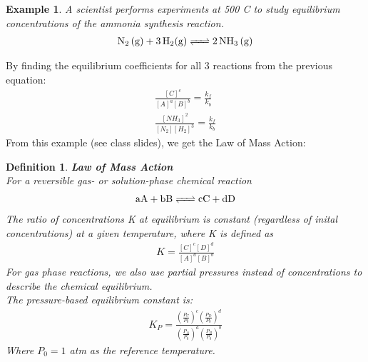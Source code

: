 \documentclass{article}  %
\newtheorem{exmp}{Example}
\newtheorem{defn}{Definition}
\begin{document}
\begin{exmp}
    A scientist performs experiments at 500 C to study equilibrium concentrations of the ammonia synthesis reaction. 
    \begin{equation*}
        \begin{aligned}
            \ce{N_2 (g) + 3H_2(g) <=> 2NH_3 (g)}        
        \end{aligned}
    \end{equation*}
\end{exmp}
By finding the equilibrium coefficients for all 3 reactions from the previous equation: 
\begin{equation*}
    \begin{aligned}
        \frac{[C]^c}{[A]^a[B]^b} = \frac{k_f}{k_b} \\
        \frac{[NH_3]^2}{[N_2][H_2]^3} = \frac{k_f}{k_b}
    \end{aligned}
\end{equation*}
From this example (see class slides), we get the Law of Mass Action:

\begin{defn}
    \textbf{Law of Mass Action} \\
    For a reversible gas- or solution-phase chemical reaction 
    \begin{equation*}
        \begin{aligned}
            \ce{aA + bB <=> cC + dD}
        \end{aligned}
    \end{equation*}
    The ratio of concentrations K at equilibrium is constant (regardless of inital concentrations) at a given temperature, where K is defined as \\
    \begin{equation*}
        \begin{aligned}
            K = \frac{[C]^c[D]^d}{[A]^a[B]^b} 
        \end{aligned}
    \end{equation*}
    For gas phase reactions, we also use partial pressures instead of concentrations to describe the chemical equilibrium. \\
    The pressure-based equilibrium constant is:
    \begin{equation*}
        \begin{aligned}
            K_P = \frac{\left(\frac{P_C}{P_0}\right)^c \left(\frac{P_D}{P_0}\right) ^d}{\left(\frac{P_A}{P_0}\right) ^a \left(\frac{P_B}{P_0}\right) ^b}
        \end{aligned}
    \end{equation*}
    Where $P_0 = 1$ atm as the reference temperature. 
\end{defn}
\end{document}
